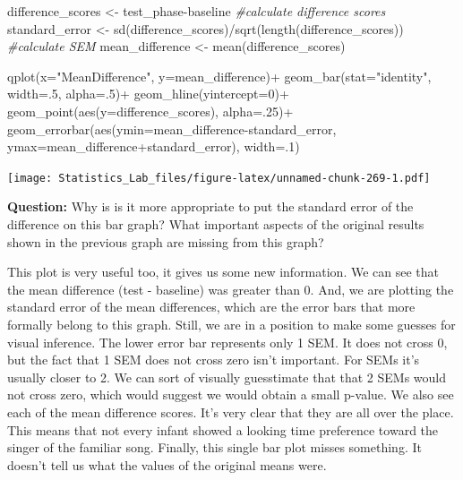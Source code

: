 \documentclass[
]{book}
\newenvironment{Shaded}{\begin{snugshade}}{\end{snugshade}}
\newcommand{\AttributeTok}[1]{\textcolor[rgb]{0.77,0.63,0.00}{#1}}
\newcommand{\CommentTok}[1]{\textcolor[rgb]{0.56,0.35,0.01}{\textit{#1}}}
\newcommand{\DecValTok}[1]{\textcolor[rgb]{0.00,0.00,0.81}{#1}}
\newcommand{\FunctionTok}[1]{\textcolor[rgb]{0.00,0.00,0.00}{#1}}
\newcommand{\NormalTok}[1]{#1}
\newcommand{\OtherTok}[1]{\textcolor[rgb]{0.56,0.35,0.01}{#1}}
\newcommand{\SpecialCharTok}[1]{\textcolor[rgb]{0.00,0.00,0.00}{#1}}
\newcommand{\StringTok}[1]{\textcolor[rgb]{0.31,0.60,0.02}{#1}}
\begin{document}
\begin{Shaded}
\begin{Highlighting}[]
\NormalTok{difference\_scores }\OtherTok{\textless{}{-}}\NormalTok{ test\_phase}\SpecialCharTok{{-}}\NormalTok{baseline }\CommentTok{\#calculate difference scores}
\NormalTok{standard\_error }\OtherTok{\textless{}{-}} \FunctionTok{sd}\NormalTok{(difference\_scores)}\SpecialCharTok{/}\FunctionTok{sqrt}\NormalTok{(}\FunctionTok{length}\NormalTok{(difference\_scores)) }\CommentTok{\#calculate SEM}
\NormalTok{mean\_difference }\OtherTok{\textless{}{-}} \FunctionTok{mean}\NormalTok{(difference\_scores)}

\FunctionTok{qplot}\NormalTok{(}\AttributeTok{x=}\StringTok{"MeanDifference"}\NormalTok{, }\AttributeTok{y=}\NormalTok{mean\_difference)}\SpecialCharTok{+}
  \FunctionTok{geom\_bar}\NormalTok{(}\AttributeTok{stat=}\StringTok{"identity"}\NormalTok{, }\AttributeTok{width=}\NormalTok{.}\DecValTok{5}\NormalTok{, }\AttributeTok{alpha=}\NormalTok{.}\DecValTok{5}\NormalTok{)}\SpecialCharTok{+}
  \FunctionTok{geom\_hline}\NormalTok{(}\AttributeTok{yintercept=}\DecValTok{0}\NormalTok{)}\SpecialCharTok{+}
  \FunctionTok{geom\_point}\NormalTok{(}\FunctionTok{aes}\NormalTok{(}\AttributeTok{y=}\NormalTok{difference\_scores), }\AttributeTok{alpha=}\NormalTok{.}\DecValTok{25}\NormalTok{)}\SpecialCharTok{+}
  \FunctionTok{geom\_errorbar}\NormalTok{(}\FunctionTok{aes}\NormalTok{(}\AttributeTok{ymin=}\NormalTok{mean\_difference}\SpecialCharTok{{-}}\NormalTok{standard\_error, }
                                  \AttributeTok{ymax=}\NormalTok{mean\_difference}\SpecialCharTok{+}\NormalTok{standard\_error), }\AttributeTok{width=}\NormalTok{.}\DecValTok{1}\NormalTok{)}
\end{Highlighting}
\end{Shaded}

\texttt{[image: Statistics\_Lab\_files/figure-latex/unnamed-chunk-269-1.pdf]}

\textbf{Question:} Why is is it more appropriate to put the standard error of the difference on this bar graph? What important aspects of the original results shown in the previous graph are missing from this graph?

This plot is very useful too, it gives us some new information. We can see that the mean difference (test - baseline) was greater than 0. And, we are plotting the standard error of the mean differences, which are the error bars that more formally belong to this graph. Still, we are in a position to make some guesses for visual inference. The lower error bar represents only 1 SEM. It does not cross 0, but the fact that 1 SEM does not cross zero isn't important. For SEMs it's usually closer to 2. We can sort of visually guesstimate that that 2 SEMs would not cross zero, which would suggest we would obtain a small p-value. We also see each of the mean difference scores. It's very clear that they are all over the place. This means that not every infant showed a looking time preference toward the singer of the familiar song. Finally, this single bar plot misses something. It doesn't tell us what the values of the original means were.
\end{document}
